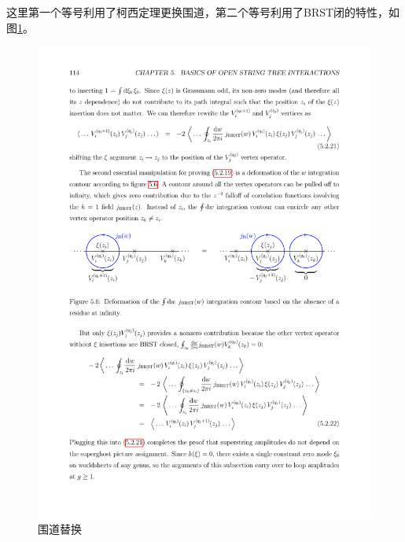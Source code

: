 这里第一个等号利用了柯西定理更换围道，第二个等号利用了BRST闭的特性，如图\ref{fig:2}。
\begin{figure}[htbp]
	\centering
	\includegraphics[width=\linewidth]{figs/fig2.pdf}
	\caption{围道替换}
	\label{fig:2}
\end{figure}

